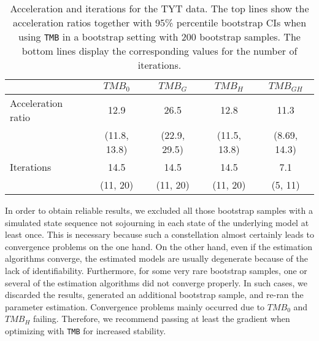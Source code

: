 \documentclass[bimj,fleqn]{w-art}\usepackage[]{graphicx}\usepackage[]{color}
\theoremstyle{plain}
\theoremstyle{definition}
\begin{document}
\begin{table}[ht]
\centering
\begin{tabular}{lcccc}
  \hline
 & \textit{${TMB_0}$} & \textit{${TMB_G}$} & \textit{${TMB_H}$} & \textit{${TMB_{GH}}$} \\ 
  \hline
Acceleration ratio & 12.9 & 26.5 & 12.8 & 11.3 \\ 
   &  (11.8, 13.8)  &  (22.9, 29.5)  &  (11.5, 13.8)  &  (8.69, 14.3)  \\ 
  Iterations & 14.5 & 14.5 & 14.5 & 7.1 \\ 
   &  (11, 20)  &  (11, 20)  &  (11, 20)  &  (5, 11)  \\ 
   \hline
\end{tabular}
\caption{Acceleration and iterations for the TYT data. The top lines show the acceleration ratios together with 95\% percentile bootstrap CIs when using {\tt TMB} in a bootstrap setting with 200 bootstrap samples. The bottom lines display the corresponding values for the number of iterations.} 
\label{table:speed-tinn}
\end{table}




In order to obtain reliable results, we excluded all those bootstrap samples with a simulated state sequence not sojourning in each state of the underlying model at least once. This is necessary because such a constellation almost certainly leads to convergence problems on the one hand. On the other hand, even if the estimation algorithms converge, the estimated models are usually degenerate because of the lack of identifiability. Furthermore, for some very rare bootstrap samples, one or several of the estimation algorithms did not converge properly. In such cases, we discarded the results, generated an additional bootstrap sample, and re-ran the parameter estimation. Convergence problems mainly occurred due to $TMB_0$ and $TMB_H$ failing. Therefore, we recommend passing at least the gradient when optimizing with {\tt{TMB}} for increased stability.\\ 
\end{document}
